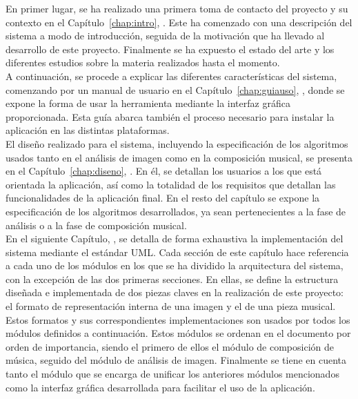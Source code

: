En primer lugar, se ha realizado una primera toma de contacto del proyecto y su contexto en el Capítulo~\ref{chap:intro}, \textit{}. Este ha comenzado con una descripción del sistema a modo de introducción, seguida de la motivación que ha llevado al desarrollo de este proyecto. Finalmente se ha expuesto el estado del arte y los diferentes estudios sobre la materia realizados hasta el momento.\\

A continuación, se procede a explicar las diferentes características del sistema, comenzando por un manual de usuario en el Capítulo~\ref{chap:guiauso}, \textit{}, donde se expone la forma de usar la herramienta mediante la interfaz gráfica proporcionada. Esta guía abarca también el proceso necesario para instalar la aplicación en las distintas plataformas.\\

El diseño realizado para el sistema, incluyendo la especificación de los algoritmos usados tanto en el análisis de imagen como en la composición musical, se presenta en el Capítulo~\ref{chap:diseno}, \textit{}. En él, se detallan los usuarios a los que está orientada la aplicación, así como la totalidad de los requisitos que detallan las funcionalidades de la aplicación final. En el resto del capítulo se expone la especificación de los algoritmos desarrollados, ya sean pertenecientes a la fase de análisis o a la fase de composición musical.\\

En el siguiente Capítulo, \textit{}, se detalla de forma exhaustiva la implementación del sistema mediante el estándar UML. Cada sección de este capítulo hace referencia a cada uno de los módulos en los que se ha dividido la arquitectura del sistema, con la excepción de las dos primeras secciones. En ellas, se define la estructura diseñada e implementada de dos piezas claves en la realización de este proyecto: el formato de representación interna de una imagen y el de una pieza musical. Estos formatos y sus correspondientes implementaciones son usados por todos los módulos definidos a continuación. Estos módulos se ordenan en el documento por orden de importancia, siendo el primero de ellos el módulo de composición de música, seguido del módulo de análisis de imagen. Finalmente se tiene en cuenta tanto el módulo que se encarga de unificar los anteriores módulos mencionados como la interfaz gráfica desarrollada para facilitar el uso de la aplicación.\\

